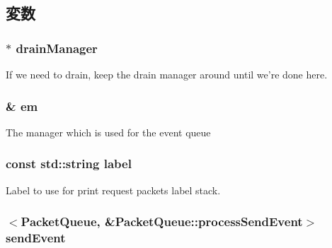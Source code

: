 \subsection{変数}
\hypertarget{classPacketQueue_a329b71fb934a93312ca0aacbf5a3f982}{
\subsubsection[{drainManager}]{$\ast$ {\bf drainManager}}}
\label{classPacketQueue_a329b71fb934a93312ca0aacbf5a3f982}
If we need to drain, keep the drain manager around until we're done here. \hypertarget{classPacketQueue_a52e0dd5074be0e61097a0dadf9cda146}{
\subsubsection[{em}]{\& {\bf em}}}
\label{classPacketQueue_a52e0dd5074be0e61097a0dadf9cda146}
The manager which is used for the event queue \hypertarget{classPacketQueue_ae471a4c4073716b769170188214fe93d}{
\subsubsection[{label}]{\setlength{\rightskip}{0pt plus 5cm}const std::string {\bf label}}}
\label{classPacketQueue_ae471a4c4073716b769170188214fe93d}
Label to use for print request packets label stack. \hypertarget{classPacketQueue_a2fc6007386af1667bd97ee56a71079fb}{
\subsubsection[{sendEvent}]{$<${\bf PacketQueue}, \&PacketQueue::processSendEvent$>$ {\bf sendEvent}}}
